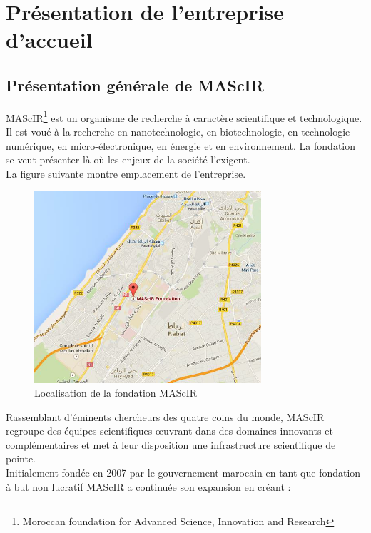\documentclass[11pt, a4paper, twoside]{book}
\begin{document}
\pagestyle{plain}

\chapter{Présentation de l'entreprise d'accueil}
\pagestyle{headings}
\section{Présentation générale de MAScIR}
MAScIR\footnote{Moroccan foundation for Advanced Science, Innovation and Research} est un organisme de recherche à caractère scientifique et technologique. Il est voué à la recherche en nanotechnologie, en biotechnologie, en technologie numérique, en micro-électronique, en énergie et en environnement. La fondation se veut présenter là où les enjeux de la société l’exigent.\\

La figure suivante montre emplacement de l’entreprise.

\begin{figure}[h]
\centering
\includegraphics[width=0.75\textwidth]{mascir_map}
\caption{Localisation de la fondation MAScIR}
\end{figure}

Rassemblant d’éminents chercheurs des quatre coins du monde, MAScIR regroupe des équipes scientifiques œuvrant dans des domaines innovants et complémentaires et met à leur disposition une infrastructure scientifique de pointe.\\

Initialement fondée en 2007 par le gouvernement marocain en tant que fondation à but non lucratif MAScIR a continuée son expansion en créant :
\end{document}
